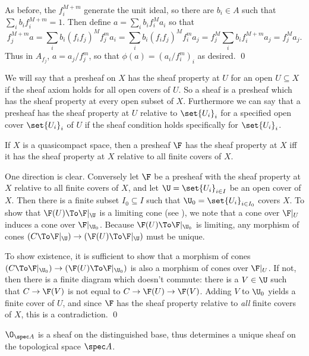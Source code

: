     As before, the $f_i^{M+m}$ generate the unit ideal, so there are $b_i\in A$ such that $\sum_ib_if_i^{M+m}=1$.
    Then define $a=\sum_ib_if_i^{M}a_i$ so that
    $$ f_j^{M+m}a = \sum_ib_i(f_if_j)^Mf_j^ma_i = \sum_ib_i(f_if_j)^Mf_i^ma_j = f_j^M\sum_ib_if_i^{M+m}a_j = f_j^Ma_j . $$
    Thus in $A_{f_j}$, $a=a_j/f_j^m$, so that $\phi(a)=(a_i/f_i^m)_i$ as desired.
    \qed

\eproof

We will say that a presheaf on $X$ {\emphcolor has the sheaf property at $U$} for an open $U\subseteq X$ if the sheaf axiom holds for all open covers of $U$.
So a sheaf is a presheaf which has the sheaf property at every open subset of $X$.
Furthermore we can say that a presheaf has the sheaf property at $U$ {\emphcolor relative to $\set{U_i}_i$} for a specified open cover $\set{U_i}_i$ of $U$
if the sheaf condition holds specifically for $\set{U_i}_i$.

\blemm

    If $X$ is a quasicompact space, then a presheaf $\F$ has the sheaf property at $X$ iff it has the sheaf property at $X$ relative to all finite covers of $X$.

\elemm

\bproof

    One direction is clear.
    Conversely let $\F$ be a presheaf with the sheaf property at $X$ relative to all finite covers of $X$, and let $\U=\set{U_i}_{i\in I}$ be an open cover of $X$.
    Then there is a finite subset $I_0\subseteq I$ such that $\U_0=\set{U_i}_{i\in I_0}$ covers $X$.
    To show that $\F(U)\To\F|_\U$ is a limiting cone (see ), we note that a cone over $\F|_U$ induces a cone over $\F|_{\U_0}$.
    Because $\F(U)\To\F|_{\U_0}$ is limiting, any morphism of cones $(C\To\F|_\U)\to(\F(U)\To\F|_\U)$ must be unique.

    To show existence, it is sufficient to show that a morphism of cones $(C\To\F|_{\U_0})\to(\F(U)\To\F|_{\U_0})$ is also a morphism of cones over $\F|_U$.
    If not, then there is a finite diagram which doesn't commute: there is a $V\in\U$ such that $C\to\F(V)$ is not equal to $C\to\F(U)\to\F(V)$.
    Adding $V$ to $\U_0$ yields a finite cover of $U$, and since $\F$ has the sheaf property relative to {\it all\/} finite covers of $X$, this is a contradiction.
    \qed

\eproof

\bthrm

    $\O_{\spec A}$ is a sheaf on the distinguished base, thus determines a unique sheaf on the topological space $\spec A$.

